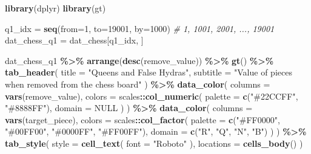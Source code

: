 \documentclass[
]{article}
\newenvironment{Shaded}{\begin{snugshade}}{\end{snugshade}}
\newcommand{\AttributeTok}[1]{\textcolor[rgb]{0.13,0.29,0.53}{#1}}
\newcommand{\CommentTok}[1]{\textcolor[rgb]{0.56,0.35,0.01}{\textit{#1}}}
\newcommand{\ConstantTok}[1]{\textcolor[rgb]{0.56,0.35,0.01}{#1}}
\newcommand{\DecValTok}[1]{\textcolor[rgb]{0.00,0.00,0.81}{#1}}
\newcommand{\FunctionTok}[1]{\textcolor[rgb]{0.13,0.29,0.53}{\textbf{#1}}}
\newcommand{\NormalTok}[1]{#1}
\newcommand{\OtherTok}[1]{\textcolor[rgb]{0.56,0.35,0.01}{#1}}
\newcommand{\SpecialCharTok}[1]{\textcolor[rgb]{0.81,0.36,0.00}{\textbf{#1}}}
\newcommand{\StringTok}[1]{\textcolor[rgb]{0.31,0.60,0.02}{#1}}
\begin{document}
\begin{Shaded}
\begin{Highlighting}[]
\FunctionTok{library}\NormalTok{(dplyr)}
\FunctionTok{library}\NormalTok{(gt)}

\NormalTok{q1\_idx }\OtherTok{=} \FunctionTok{seq}\NormalTok{(}\AttributeTok{from=}\DecValTok{1}\NormalTok{, }\AttributeTok{to=}\DecValTok{19001}\NormalTok{, }\AttributeTok{by=}\DecValTok{1000}\NormalTok{) }\CommentTok{\# 1, 1001, 2001, ..., 19001}
\NormalTok{dat\_chess\_q1 }\OtherTok{=}\NormalTok{ dat\_chess[q1\_idx, ]}

\NormalTok{dat\_chess\_q1 }\SpecialCharTok{\%\textgreater{}\%}
  \FunctionTok{arrange}\NormalTok{(}\FunctionTok{desc}\NormalTok{(remove\_value)) }\SpecialCharTok{\%\textgreater{}\%}
  \FunctionTok{gt}\NormalTok{() }\SpecialCharTok{\%\textgreater{}\%}
  \FunctionTok{tab\_header}\NormalTok{(}
    \AttributeTok{title =} \StringTok{"Queens and False Hydras"}\NormalTok{,}
    \AttributeTok{subtitle =} \StringTok{"Value of pieces when removed from the chess board"}
\NormalTok{  ) }\SpecialCharTok{\%\textgreater{}\%}
  \FunctionTok{data\_color}\NormalTok{(}
    \AttributeTok{columns =} \FunctionTok{vars}\NormalTok{(remove\_value),}
    \AttributeTok{colors =}\NormalTok{ scales}\SpecialCharTok{::}\FunctionTok{col\_numeric}\NormalTok{(}
      \AttributeTok{palette =} \FunctionTok{c}\NormalTok{(}\StringTok{"\#22CCFF"}\NormalTok{, }\StringTok{"\#8888FF"}\NormalTok{),}
      \AttributeTok{domain =} \ConstantTok{NULL}
\NormalTok{    )}
\NormalTok{  ) }\SpecialCharTok{\%\textgreater{}\%}
  \FunctionTok{data\_color}\NormalTok{(}
    \AttributeTok{columns =} \FunctionTok{vars}\NormalTok{(target\_piece),}
    \AttributeTok{colors =}\NormalTok{ scales}\SpecialCharTok{::}\FunctionTok{col\_factor}\NormalTok{(}
      \AttributeTok{palette =} \FunctionTok{c}\NormalTok{(}\StringTok{"\#FF0000"}\NormalTok{, }\StringTok{"\#00FF00"}\NormalTok{, }\StringTok{"\#0000FF"}\NormalTok{, }\StringTok{"\#FF00FF"}\NormalTok{),}
      \AttributeTok{domain =} \FunctionTok{c}\NormalTok{(}\StringTok{"R"}\NormalTok{, }\StringTok{"Q"}\NormalTok{, }\StringTok{"N"}\NormalTok{, }\StringTok{"B"}\NormalTok{)}
\NormalTok{    )}
\NormalTok{  ) }\SpecialCharTok{\%\textgreater{}\%}
  \FunctionTok{tab\_style}\NormalTok{(}
    \AttributeTok{style =} \FunctionTok{cell\_text}\NormalTok{(}
      \AttributeTok{font =} \StringTok{"Roboto"}
\NormalTok{    ),}
    \AttributeTok{locations =} \FunctionTok{cells\_body}\NormalTok{()}
\NormalTok{  )}
\end{Highlighting}
\end{Shaded}
\end{document}
